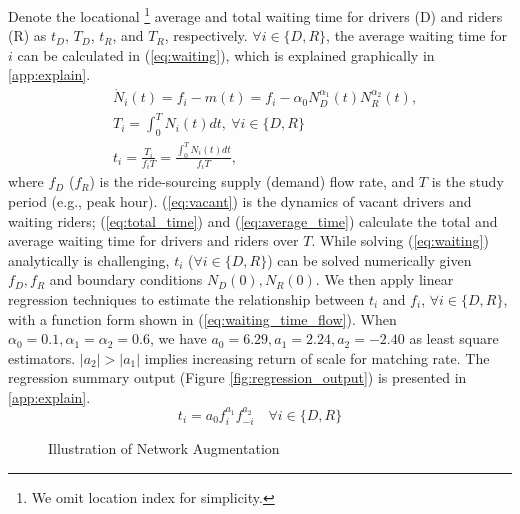 \documentclass[review]{elsarticle}
\begin{document}
Denote the locational \footnote{We omit location index for simplicity.} average and total waiting time for drivers (D) and riders (R) as $t_D$, $T_D$, $t_R$, and $T_R$, respectively.  $\forall i \in \{D, R\}$, the average waiting time for $i$ can be calculated in (\ref{eq:waiting}), which is explained graphically in \ref{app:explain}.
\begin{subequations}
\begin{align}
& \Dot{N}_i(t) = f_i - m(t) = f_i - \alpha_0N_D^{\alpha_1}(t)N_R^{\alpha_2}(t), \label{eq:vacant}\\
& T_i = \int_{0}^{T}N_i(t) d{t}, \ \forall i \in \{D, R\} \label{eq:total_time}\\
& t_i = \frac{T_i}{f_iT} = \frac{\int_{0}^{T}N_i(t) d{t}}{f_iT},  \label{eq:average_time}
\end{align}
\label{eq:waiting}
\end{subequations}
where $f_{D}$ ($f_{R}$) is the ride-sourcing supply (demand) flow rate, and $T$ is the study period (e.g., peak hour). (\ref{eq:vacant}) is the dynamics of vacant drivers and waiting riders; (\ref{eq:total_time}) and  (\ref{eq:average_time}) calculate the total and average waiting time for drivers and riders over $T$. While solving (\ref{eq:waiting}) analytically is challenging, $t_i$ ($\forall i \in \{D, R\}$) can be solved numerically given $f_D, f_R$ and boundary conditions $N_D(0), N_R(0)$. We then apply linear regression techniques to estimate the relationship between $t_i$ and $f_i$, $\forall i \in \{D, R\}$, with a function form shown in (\ref{eq:waiting_time_flow}). When $\alpha_0 = 0.1, \alpha_1 = \alpha_2 = 0.6$, we have $a_0 = 6.29, a_1 = 2.24, a_2 = -2.40$ as least square estimators. $|a_2| > |a_1|$ implies increasing return of scale for matching rate. The regression summary output (Figure \ref{fig:regression_output}) is presented in \ref{app:explain}. 
\begin{equation}
t_{i} = a_0 f_{i}^{a_1}f_{-i}^{a_2}\quad \forall i \in \{D, R\}\label{eq:waiting_time_flow}
\end{equation}

\begin{figure*}[htbp]
	\centering
	\vspace{-2em}
	\caption{Illustration of Network Augmentation}
	\label{fig:aug_graph}
\end{figure*}
\end{document}
